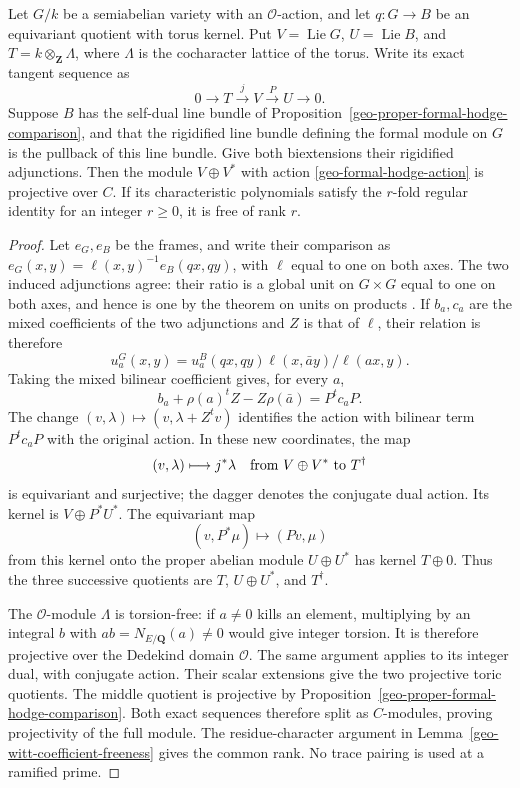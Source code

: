 \begin{proposition}\label{geo-toric-hodge-filtration}
Let $G/k$ be a semiabelian variety with an $\mathcal O$-action,
and let $q:G\to B$ be an equivariant quotient with torus kernel.
Put $V=\operatorname{Lie}G$, $U=\operatorname{Lie}B$, and
$T=k\otimes_{\mathbf Z}\Lambda$, where $\Lambda$ is the
cocharacter lattice of the torus. Write its exact tangent sequence
as
\[
                 0\longrightarrow T\xrightarrow{j}V
                    \xrightarrow{P}U\longrightarrow0.
\]
Suppose $B$ has the self-dual line bundle of
Proposition~\ref{geo-proper-formal-hodge-comparison}, and that the
rigidified line bundle defining the formal module on $G$ is the
pullback of this line bundle. Give both biextensions their
rigidified adjunctions.
Then the module $V\oplus V^*$ with action
\eqref{geo-formal-hodge-action} is projective over $C$.
If its characteristic polynomials satisfy
the $r$-fold regular identity for an integer $r\geq0$,
it is free of rank $r$.
\end{proposition}
\begin{proof}
Let $e_G,e_B$ be the frames, and write their comparison as
$e_G(x,y)=\ell(x,y)^{-1}e_B(qx,qy)$, with $\ell$ equal to one
on both axes. The two induced adjunctions agree: their ratio is
a global unit on $G\times G$ equal to one on both axes, and hence
is one by the theorem on units on products
\cite[Theorem 1.1]{conrad-units-product}.
If $b_a,c_a$ are the mixed coefficients of the two adjunctions
and $Z$ is that of $\ell$, their relation is therefore
\[
 u_a^G(x,y)=u_a^B(qx,qy)\ell(x,\bar a y)/\ell(ax,y).
\]
Taking the mixed bilinear coefficient gives, for every $a$,
\begin{equation}\label{geo-toric-gauge-comparison}
 b_a+\rho(a)^tZ-Z\rho(\bar a)=P^t c_aP.
\end{equation}
The change $(v,\lambda)\mapsto(v,\lambda+Z^tv)$ identifies the
action with bilinear term $P^tc_aP$ with the original action.
In these new coordinates, the map
\[
       (v,\lambda)\longmapsto j^*\lambda
          \quad\hbox{from }V\oplus V^*
          \hbox{ to }T^\dagger
\]
is equivariant and surjective; the dagger denotes the
conjugate dual action. Its kernel is $V\oplus P^*U^*$.
The equivariant map
\[
           (v,P^*\mu)\longmapsto(Pv,\mu)
\]
from this kernel onto the proper abelian module $U\oplus U^*$
has kernel $T\oplus0$.
Thus the three successive quotients are
$T$, $U\oplus U^*$, and $T^\dagger$.

The $\mathcal O$-module $\Lambda$ is torsion-free: if $a\ne0$
kills an element, multiplying by an integral $b$ with
$ab=N_{E/\mathbf Q}(a)\ne0$ would give integer torsion.
It is therefore projective over the Dedekind domain $\mathcal O$.
The same argument applies to its integer dual, with conjugate
action. Their scalar extensions give the two projective toric
quotients. The middle quotient is projective by
Proposition~\ref{geo-proper-formal-hodge-comparison}.
Both exact sequences therefore split as $C$-modules, proving
projectivity of the full module. The residue-character argument
in Lemma~\ref{geo-witt-coefficient-freeness} gives the common rank.
No trace pairing is used at a ramified prime.
\end{proof}

